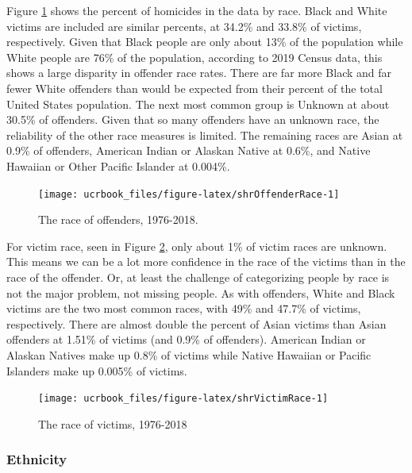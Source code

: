 \documentclass[
  12pt,
  openany]{book}
\begin{document}
Figure \ref{fig:shrOffenderRace} shows the percent of homicides in the data by race. Black and White victims are included are similar percents, at 34.2\% and 33.8\% of victims, respectively. Given that Black people are only about 13\% of the population while White people are 76\% of the population, according to 2019 Census data, this shows a large disparity in offender race rates. There are far more Black and far fewer White offenders than would be expected from their percent of the total United States population. The next most common group is Unknown at about 30.5\% of offenders. Given that so many offenders have an unknown race, the reliability of the other race measures is limited. The remaining races are Asian at 0.9\% of offenders, American Indian or Alaskan Native at 0.6\%, and Native Hawaiian or Other Pacific Islander at 0.004\%.

\begin{figure}

{\centering \texttt{[image: ucrbook\_files/figure-latex/shrOffenderRace-1]} 

}

\caption{The race of offenders, 1976-2018.}\label{fig:shrOffenderRace}
\end{figure}

For victim race, seen in Figure \ref{fig:shrVictimRace}, only about 1\% of victim races are unknown. This means we can be a lot more confidence in the race of the victims than in the race of the offender. Or, at least the challenge of categorizing people by race is not the major problem, not missing people. As with offenders, White and Black victims are the two most common races, with 49\% and 47.7\% of victims, respectively. There are almost double the percent of Asian victims than Asian offenders at 1.51\% of victims (and 0.9\% of offenders). American Indian or Alaskan Natives make up 0.8\% of victims while Native Hawaiian or Pacific Islanders make up 0.005\% of victims.

\begin{figure}

{\centering \texttt{[image: ucrbook\_files/figure-latex/shrVictimRace-1]} 

}

\caption{The race of victims, 1976-2018}\label{fig:shrVictimRace}
\end{figure}

\hypertarget{ethnicity-1}{%
\subsubsection{Ethnicity}\label{ethnicity-1}}
\end{document}
